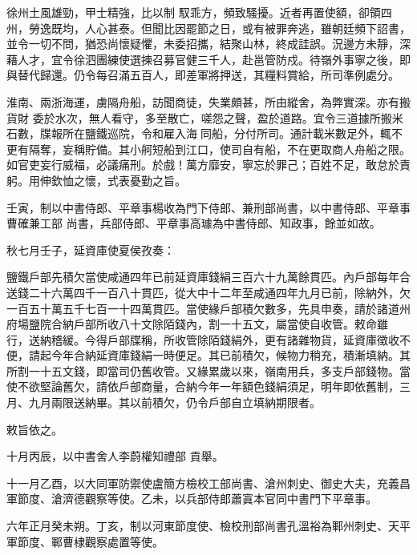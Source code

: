 \begin{pinyinscope}
 徐州土風雄勁，甲士精強，比以制
 馭乖方，頻致騷擾。近者再置使額，卻領四州，勞逸既均，人心甚泰。但聞比因罷節之日，或有被罪奔逃，雖朝廷頻下詔書，並令一切不問，猶恐尚懷疑懼，未委招攜，結聚山林，終成詿誤。況邊方未靜，深藉人才，宜令徐泗團練使選揀召募官健三千人，赴邕管防戍。待嶺外事寧之後，即與替代歸還。仍令每召滿五百人，即差軍將押送，其糧料賞給，所司準例處分。



 淮南、兩浙海運，虜隔舟船，訪聞商徒，失業頗甚，所由縱舍，為弊實深。亦有搬貨財
 委於水次，無人看守，多至散亡，嗟怨之聲，盈於道路。宜令三道據所搬米石數，牒報所在鹽鐵巡院，令和雇入海同船，分付所司。通計載米數足外，輒不更有隔奪，妄稱貯備。其小舸短船到江口，使司自有船，不在更取商人舟船之限。如官吏妄行威福，必議痛刑。於戲！萬方靡安，寧忘於罪己；百姓不足，敢怠於責躬。用伸欽恤之懷，式表憂勤之旨。



 壬寅，制以中書侍郎、平章事楊收為門下侍郎、兼刑部尚書，以中書侍郎、平章事曹確兼工部
 尚書，兵部侍郎、平章事高璩為中書侍郎、知政事，餘並如故。



 秋七月壬子，延資庫使夏侯孜奏：



 鹽鐵戶部先積欠當使咸通四年已前延資庫錢絹三百六十九萬餘貫匹。內戶部每年合送錢二十六萬四千一百八十貫匹，從大中十二年至咸通四年九月已前，除納外，欠一百五十萬五千七百一十四萬貫匹。當使緣戶部積欠數多，先具申奏，請於諸道州府場鹽院合納戶部所收八十文除陌錢內，割一十五文，屬當使自收管。敕命雖
 行，送納稽緩。今得戶部牒稱，所收管除陌錢絹外，更有諸雜物貨，延資庫徵收不便，請起今年合納延資庫錢絹一時便足。其已前積欠，候物力稍充，積漸填納。其所割一十五文錢，即當司仍舊收管。又緣累歲以來，嶺南用兵，多支戶部錢物。當使不欲堅論舊欠，請依戶部商量，合納今年一年額色錢絹須足，明年即依舊制，三月、九月兩限送納畢。其以前積欠，仍令戶部自立填納期限者。



 敕旨依之。



 十月丙辰，以中書舍人李蔚權知禮部
 貢舉。



 十一月乙酉，以大同軍防禦使盧簡方檢校工部尚書、滄州刺史、御史大夫，充義昌軍節度、滄濟德觀察等使。乙未，以兵部侍郎蕭寘本官同中書門下平章事。



 六年正月癸未朔。丁亥，制以河東節度使、檢校刑部尚書孔溫裕為鄆州刺史、天平軍節度、鄆曹棣觀察處置等使。




\end{pinyinscope}
